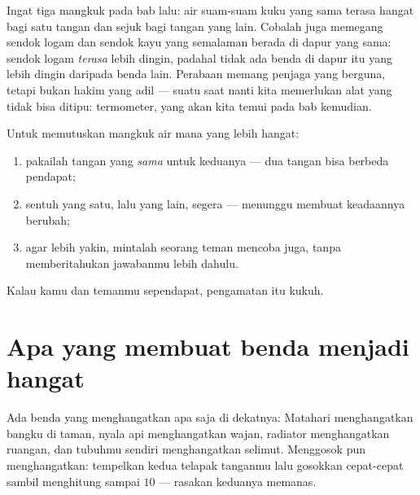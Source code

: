 \begin{remark}\label{rem:g1:hot-and-cold:fooled}
Ingat tiga mangkuk pada bab lalu: air suam-suam kuku yang sama terasa
hangat bagi satu tangan dan sejuk bagi tangan yang lain. Cobalah juga
memegang sendok logam dan sendok kayu yang semalaman berada di dapur
yang sama: sendok logam \emph{terasa} lebih dingin, padahal tidak ada
benda di dapur itu yang lebih dingin daripada benda lain. Perabaan
memang penjaga yang berguna, tetapi bukan hakim yang adil --- suatu
saat nanti kita memerlukan alat yang tidak bisa ditipu: termometer,
yang akan kita temui pada bab kemudian.
\end{remark}

\begin{method}\label{met:g1:hot-and-cold:compare}
Untuk memutuskan mangkuk air mana yang lebih hangat:
\begin{enumerate}
  \item pakailah tangan yang \emph{sama} untuk keduanya --- dua tangan
        bisa berbeda pendapat;
  \item sentuh yang satu, lalu yang lain, segera --- menunggu membuat
        keadaannya berubah;
  \item agar lebih yakin, mintalah seorang teman mencoba juga, tanpa
        memberitahukan jawabanmu lebih dahulu.
\end{enumerate}
Kalau kamu dan temanmu sependapat, pengamatan itu kukuh.
\end{method}

\section{Apa yang membuat benda menjadi hangat}

\begin{example}\label{ex:g1:hot-and-cold:warmers}
Ada benda yang menghangatkan apa saja di dekatnya: Matahari
menghangatkan bangku di taman, nyala api menghangatkan wajan, radiator
menghangatkan ruangan, dan tubuhmu sendiri menghangatkan selimut.
Menggosok pun menghangatkan: tempelkan kedua telapak tanganmu lalu
gosokkan cepat-cepat sambil menghitung sampai $10$ --- rasakan
keduanya memanas.
\end{example}

